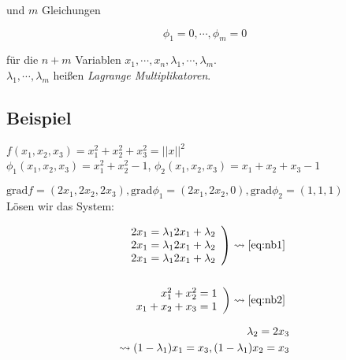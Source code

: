 und $m$ Gleichungen

\begin{equation}
    \phi_1 = 0, \cdots, \phi_m = 0
    \label{eq:nb2}
\end{equation}

für die $n+m$ Variablen $x_1, \cdots, x_n, \lambda_1, \cdots, \lambda_m$.\\
$\lambda_1, \cdots, \lambda_m$ heißen {\it Lagrange Multiplikatoren}.

\subsection{Beispiel}

$f(x_1, x_2, x_3) = x_1^2 + x_2^2 + x_3^2 = ||x||^2$ \\
$\phi_1(x_1, x_2, x_3) = x_1^2 + x_2^2 - 1$, $\phi_2(x_1, x_2, x_3) = x_1 + x_2 + x_3 - 1$

$\mathrm{grad}f = (2x_1, 2x_2, 2x_3), \mathrm{grad}\phi_1 = (2x_1, 2x_2, 0), \mathrm{grad}\phi_2 = (1, 1, 1)$ \\
Lösen wir das System:

\begin{align*}
    \left. \begin{array}{r}
        2x_1 = \lambda_1 2 x_1 + \lambda_2 \\
        2x_1 = \lambda_1 2 x_1 + \lambda_2 \\
        2x_1 = \lambda_1 2 x_1 + \lambda_2
    \end{array} \right) \leadsto \eqref{eq:nb1}
    \\ \\
    \left. \begin{array}{r}
        x_1^2 + x_2^2 = 1 \\
        x_1 + x_2 + x_3 = 1
    \end{array} \right) \leadsto \eqref{eq:nb2}
\end{align*}

\begin{align}
    \lambda_2 = 2x_3 \notag \\
    \leadsto (1-\lambda_1)x_1 = x_3, (1-\lambda_1)x_2 = x_3 \label{eq:nb3}
\end{align}

